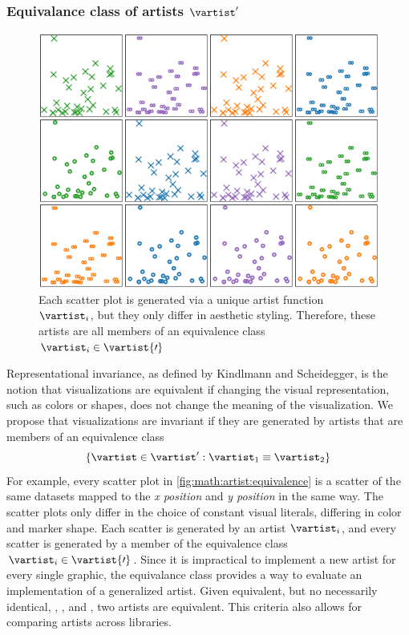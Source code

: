 \documentclass[../main.tex]{subfiles}
\begin{document}
\subsubsection{Equivalance class of artists $\vartist^{\prime}$}
\label{sec:artist_equivalance}
\begin{figure}[H]
    \includegraphics[width=1\textwidth]{figures/math/equivalent_artists.png}
   \caption{Each scatter plot is generated via a unique artist function $\vartist_{i}$, but they only differ in aesthetic styling. Therefore, these artists are all members of an equivalence class $\vartist_{i} \in \vartist{\prime}$}
    \label{fig:math:artist:equivalence}
\end{figure}
Representational invariance, as defined by Kindlmann and Scheidegger, is the notion that visualizations are equivalent if changing the visual representation, such as colors or shapes, does not change the meaning of the visualization\cite{kindlmannAlgebraicProcessVisualization2014}. We propose that visualizations are invariant if they are generated by artists that are members of an equivalence class 
\begin{equation*}
\{\vartist \in \vartist^{\prime}: \vartist_{1} \equiv \vartist_{2}\}
\label{eq:math:artist:aprime}
\end{equation*}
For example, every scatter plot in \autoref{fig:math:artist:equivalence} is a scatter of the same datasets mapped to the \textit{x position} and \textit{y position} in the same way. The scatter plots only differ in the choice of constant visual literals, differing in color and marker shape. Each scatter is generated by an artist $\vartist_{i}$, and every scatter is generated by a member of the equivalence class $\vartist_{i} \in \vartist{\prime}$. Since it is impractical to implement a new artist for every single graphic, the equivalance class provides a way to evaluate an implementation of a generalized artist. Given equivalent, but no necessarily identical, \vchannel, \vmark, and \vindex, two artists are equivalent. This criteria also allows for comparing artists across libraries. 
\end{document}

